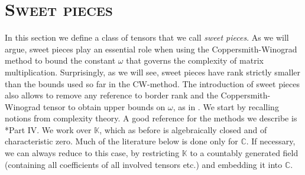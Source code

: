 \documentclass[a4paper,11pt,reqno]{amsart}
\newcommand{\calB}{\mathcal{B}}
\newcommand{\bbK}{\mathbb{K}}
\newcommand{\bbZ}{\mathbb{Z}}
\newcommand{\oldtext}[1]{\textcolor{darkelectricblue}{#1}}
\numberwithin{equation}{section}
\theoremstyle{definition}
\newtheorem{defn}[equation]{Definition}
\theoremstyle{plain}
\theoremstyle{remark}
\def\CC{\mathbb{C}}
\begin{document}
\section{\normalfont \scshape{}\selectfont Sweet pieces}


\noindent In this section we define a class of tensors that we call \emph{sweet pieces}. As we will argue, sweet pieces play an essential role when using  the Coppersmith-Winograd method to bound the constant $\omega$ that governs the complexity of matrix multiplication. Surprisingly, as we will see, sweet pieces have rank strictly smaller than the bounds used so far in the CW-method. The introduction of sweet pieces also allows to remove any reference to border rank and the Coppersmith-Winograd tensor to obtain upper bounds on $\omega$, as in \cite{CW}.
We start by recalling notions from complexity theory.  A good reference for
the methods we describe is \cite{BCS97}*{Part IV}.
We work over $\bbK$, which as before is algebraically closed and of
characteristic zero. Much of the literature below is done only for $\CC$. If necessary, we can always reduce to this case, by restricting $\bbK$ to a countably generated field (containing all
    coefficients of all involved tensors etc.) and embedding it into $\CC$.



\end{document}

